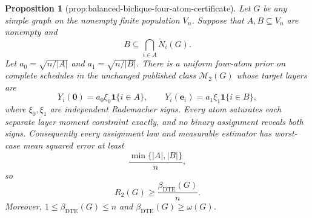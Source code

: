 \documentclass{article}
\newtheorem{proposition}{Proposition}
\begin{document}
\begin{proposition}[prop:balanced-biclique-four-atom-certificate]\label{prop:balanced-biclique-four-atom-certificate}
Let \(G\) be any simple graph on the nonempty finite population \(V_n\).  Suppose that \(A,B\subseteq V_n\) are nonempty and
\[
B\subseteq\bigcap_{i\in A}\widetilde N_i(G).
\]
Let \(a_0=\sqrt{n/|A|}\) and \(a_1=\sqrt{n/|B|}\).  There is a uniform four-atom prior on complete schedules in the unchanged published class \(\mathcal M_2(G)\) whose target layers are
\[
Y_i(\mathbf 0)=a_0\xi_0\mathbf 1\{i\in A\},
\qquad
Y_i(\mathbf e_i)=a_1\xi_1\mathbf 1\{i\in B\},
\]
where \(\xi_0,\xi_1\) are independent Rademacher signs.  Every atom saturates each separate layer moment constraint exactly, and no binary assignment reveals both signs.  Consequently every assignment law and measurable estimator has worst-case mean squared error at least
\[
\frac{\min\{|A|,|B|\}}{n},
\]
so
\[
R_2(G)\geq\frac{\beta_{\mathrm{DTE}}(G)}{n}.
\]
Moreover, \(1\leq\beta_{\mathrm{DTE}}(G)\leq n\) and \(\beta_{\mathrm{DTE}}(G)\geq\omega(G)\).
\end{proposition}
\end{document}
